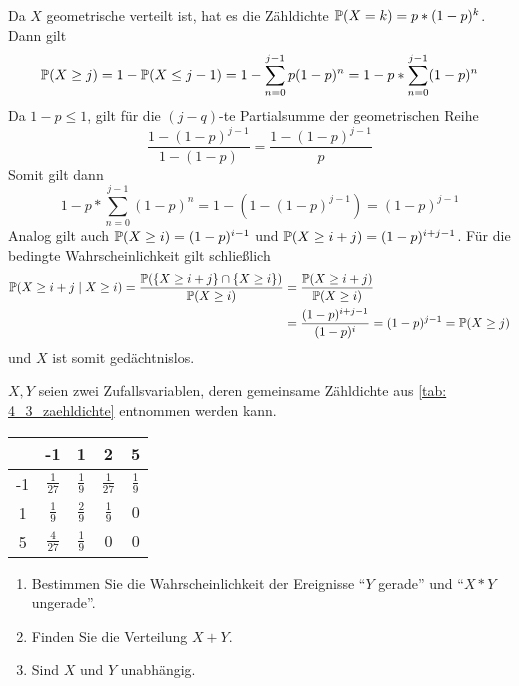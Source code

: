 \begin{exercisePage}
	Da $X$ geometrische verteilt ist, hat es die Zähldichte $\P(X=k) = p * (1-p)^k$. Dann gilt
	\begin{equation*}
		\P(X \geq j) = 1 - \P(X \leq j-1) = 1 - \sum_{n=0}^{j-1} p(1-p)^n  = 1 - p * \sum_{n=0}^{j-1} (1-p)^n
	\end{equation*}
	Da $1-p \leq 1$, gilt für die $(j-q)$-te Partialsumme der geometrischen Reihe
	\begin{equation*}
		\frac{1-(1-p)^{j-1}}{1 - (1-p)} = \frac{1 - (1-p)^{j-1}}{p}
	\end{equation*}
	Somit gilt dann
	\begin{equation*}
		1 - p * \sum_{n=0}^{j-1} (1-p)^n = 1 - (1 - (1-p)^{j-1}) = (1-p)^{j-1}
	\end{equation*}
	Analog gilt auch $\P(X \geq i) = (1-p)^{i-1}$ und $\P(X \geq i+j) = (1-p)^{i+j-1}$. Für die bedingte Wahrscheinlichkeit gilt schließlich
	\begin{equation*}
		\begin{aligned}
			\P(X \geq i+j \mid X \geq i) = \frac{\P( \menge{X \geq i+j} \cap \menge{X \geq i})}{\P(X \geq i)} &= \frac{\P(X \geq i+j)}{\P(X \geq i)} \\
			&= \frac{(1-p)^{i+j-1}}{(1-p)^i} = (1-p)^{j-1} = \P(X \geq j)
		\end{aligned}
	\end{equation*}
	und $X$ ist somit gedächtnislos.
	

	\begin{homework}
		$X,Y$ seien zwei Zufallsvariablen, deren gemeinsame Zähldichte aus \cref{tab: 4_3_zaehldichte} entnommen werden kann.
		
		{\centering
		\begin{tabular}{c||c|c|c|c} \label{tab: 4_3_zaehldichte}
			\diagbox[dir=NW, height=18pt, trim=l]{$X$}{$Y$} & -1 & 1 & 2 & 5 \\ \hline \hline
			-1 & $\frac{1}{27}$ & $\frac{1}{9}$ & $\frac{1}{27}$ & $\frac{1}{9}$ \\
			1  & $\frac{1}{ 9}$ & $\frac{2}{9}$ & $\frac{1}{ 9}$ & $0$ \\
			5  & $\frac{4}{27}$ & $\frac{1}{9}$ & $0$            & $0$ \\
		\end{tabular}
		}
		
		\begin{enumerate}[leftmargin=*, nolistsep]
			\item Bestimmen Sie die Wahrscheinlichkeit der Ereignisse ``$Y$ gerade'' und ``$X * Y$ ungerade''.
			\item Finden Sie die Verteilung $X+Y$. 
			\item Sind $X$ und $Y$ unabhängig.
		\end{enumerate}
	\end{homework}
	

\end{exercisePage}
